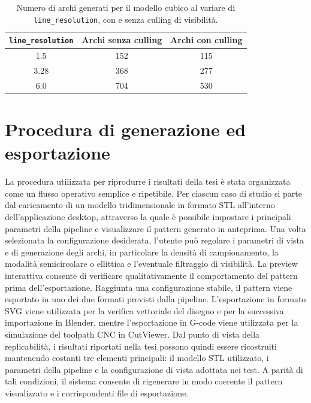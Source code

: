 \documentclass[a4paper,11pt,titlepage,twoside]{book}
\newcommand{\1}{\mathbf{1}}
\numberwithin{equation}{chapter}
\theoremstyle{plain}
\theoremstyle{definition}
\begin{document}
	\begin{table}[htbp]
		\centering
		\caption[Numero di archi sul cubo al variare della line resolution]{Numero di archi generati per il modello cubico al variare di \texttt{line\_resolution}, con e senza culling di visibilità.}
		\label{tab:appendix-line-resolution-cube}
		\begin{tabular}{ccc}
			\toprule
			\texttt{line\_resolution} & Archi senza culling & Archi con culling \\
			\midrule
			1.5  & 152 & 115 \\
			3.28 & 368 & 277 \\
			6.0  & 704 & 530 \\
			\bottomrule
		\end{tabular}
	\end{table}
	
	\section{Procedura di generazione ed esportazione}
	
	La procedura utilizzata per riprodurre i risultati della tesi è stata organizzata come un flusso operativo semplice e ripetibile. Per ciascun caso di studio si parte dal caricamento di un modello tridimensionale in formato STL all’interno dell’applicazione desktop, attraverso la quale è possibile impostare i principali parametri della pipeline e visualizzare il pattern generato in anteprima.
	Una volta selezionata la configurazione desiderata, l’utente può regolare i parametri di vista e di generazione degli archi, in particolare la densità di campionamento, la modalità semicircolare o ellittica e l’eventuale filtraggio di visibilità. La preview interattiva consente di verificare qualitativamente il comportamento del pattern prima dell’esportazione.
	Raggiunta una configurazione stabile, il pattern viene esportato in uno dei due formati previsti dalla pipeline. L’esportazione in formato SVG viene utilizzata per la verifica vettoriale del disegno e per la successiva importazione in Blender, mentre l’esportazione in G-code viene utilizzata per la simulazione del toolpath CNC in CutViewer.
	Dal punto di vista della replicabilità, i risultati riportati nella tesi possono quindi essere ricostruiti mantenendo costanti tre elementi principali: il modello STL utilizzato, i parametri della pipeline e la configurazione di vista adottata nei test. A parità di tali condizioni, il sistema consente di rigenerare in modo coerente il pattern visualizzato e i corrispondenti file di esportazione.
	
\end{document}
